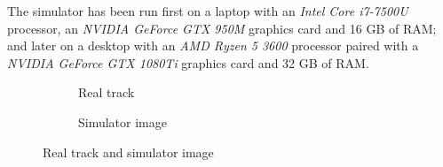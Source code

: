 \documentclass[a4paper,12pt,sort&compress]{article}
\begin{document}
    The simulator has been run first on a laptop with an \textit{Intel Core i7-7500U}
    processor, an \textit{NVIDIA GeForce GTX 950M} graphics card and 16 GB of
    RAM; and later on a desktop with an \textit{AMD Ryzen 5 3600} processor paired with a
    \textit{NVIDIA GeForce GTX 1080Ti} graphics card and 32 GB of RAM.  
    

    \begin{figure}
        \begin{subfigure}[c]{\textwidth}
            \centering
            \caption{ Real track }
        \end{subfigure}
        \begin{subfigure}[c]{\textwidth}
            \centering
            \caption{ Simulator image }
        \end{subfigure}
        \caption{Real track and simulator image}
        \label{fig:simulator_real_track}
    \end{figure}
\end{document}
